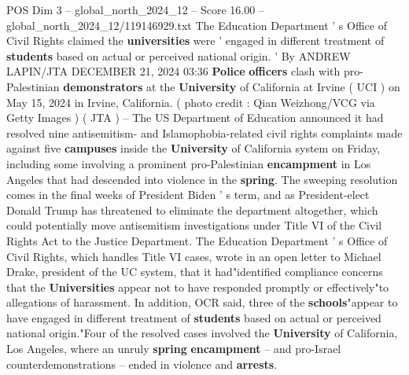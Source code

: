 \begin{textsample}{POS Dim 3 – global\_north\_2024\_12 – Score 16.00 – global\_north\_2024\_12/119146929.txt}  \label{ex:f3_pos_213}
The Education Department ' s Office of Civil Rights claimed the \textbf{universities} were ' engaged in different treatment of \textbf{students} based on actual or perceived national origin. ' By ANDREW LAPIN/JTA DECEMBER 21, 2024 03:36 \textbf{Police} \textbf{officers} clash with pro-Palestinian \textbf{demonstrators} at the \textbf{University} of California at Irvine ( UCI ) on May 15, 2024 in Irvine, California. ( photo credit : Qian Weizhong/VCG via Getty Images ) ( JTA ) -- The US Department of Education announced it had resolved nine antisemitism- and Islamophobia-related civil rights complaints made against five \textbf{campuses} inside the \textbf{University} of California system on Friday, including some involving a prominent pro-Palestinian \textbf{encampment} in Los Angeles that had descended into violence in the \textbf{spring}.
The sweeping resolution comes in the final weeks of President Biden ' s term, and as President-elect Donald Trump has threatened to eliminate the department altogether, which could potentially move antisemitism investigations under Title VI of the Civil Rights Act to the Justice Department.
The Education Department ' s Office of Civil Rights, which handles Title VI cases, wrote in an open letter to Michael Drake, president of the UC system, that it had"identified compliance concerns that the \textbf{Universities} appear not to have responded promptly or effectively"to allegations of harassment.
In addition, OCR said, three of the \textbf{schools}"appear to have engaged in different treatment of \textbf{students} based on actual or perceived national origin."Four of the resolved cases involved the \textbf{University} of California, Los Angeles, where an unruly \textbf{spring} \textbf{encampment} -- and pro-Israel counterdemonstrations -- ended in violence and \textbf{arrests}.

\end{textsample}
